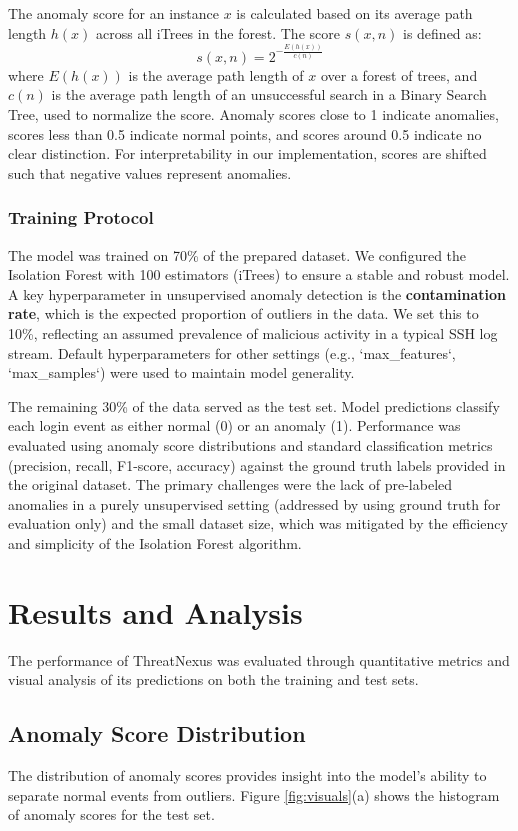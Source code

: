 \documentclass[conference]{IEEEtran}
\begin{document}
The anomaly score for an instance $x$ is calculated based on its average path length $h(x)$ across all iTrees in the forest. The score $s(x, n)$ is defined as:
\[ s(x, n) = 2^{-\frac{E(h(x))}{c(n)}} \]
where $E(h(x))$ is the average path length of $x$ over a forest of trees, and $c(n)$ is the average path length of an unsuccessful search in a Binary Search Tree, used to normalize the score. Anomaly scores close to 1 indicate anomalies, scores less than 0.5 indicate normal points, and scores around 0.5 indicate no clear distinction. For interpretability in our implementation, scores are shifted such that negative values represent anomalies.

\subsubsection{Training Protocol}
The model was trained on 70\% of the prepared dataset. We configured the Isolation Forest with 100 estimators (iTrees) to ensure a stable and robust model. A key hyperparameter in unsupervised anomaly detection is the \textbf{contamination rate}, which is the expected proportion of outliers in the data. We set this to 10\%, reflecting an assumed prevalence of malicious activity in a typical SSH log stream. Default hyperparameters for other settings (e.g., `max_features`, `max_samples`) were used to maintain model generality.

The remaining 30\% of the data served as the test set. Model predictions classify each login event as either normal (0) or an anomaly (1). Performance was evaluated using anomaly score distributions and standard classification metrics (precision, recall, F1-score, accuracy) against the ground truth labels provided in the original dataset. The primary challenges were the lack of pre-labeled anomalies in a purely unsupervised setting (addressed by using ground truth for evaluation only) and the small dataset size, which was mitigated by the efficiency and simplicity of the Isolation Forest algorithm.

\section{Results and Analysis}
The performance of ThreatNexus was evaluated through quantitative metrics and visual analysis of its predictions on both the training and test sets.

\subsection{Anomaly Score Distribution}
The distribution of anomaly scores provides insight into the model's ability to separate normal events from outliers. Figure \ref{fig:visuals}(a) shows the histogram of anomaly scores for the test set.
\end{document}
